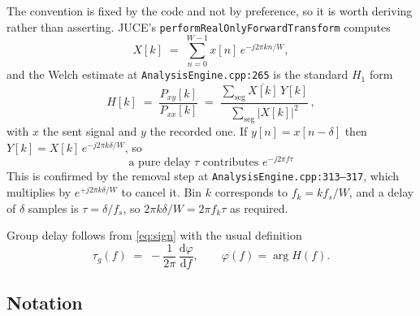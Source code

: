 \documentclass[11pt,a4paper]{article}
\newcommand{\srcref}[2]{\texttt{\small #1}\discretionary{}{}{}\texttt{\small :#2}}
\newcommand{\code}[1]{\texttt{\small #1}}
\begin{document}
The convention is fixed by the code and not by preference, so it is worth
deriving rather than asserting. JUCE's \code{performRealOnlyForwardTransform}
computes
%
\begin{equation}
  X[k] \;=\; \sum_{n=0}^{W-1} x[n]\, e^{-j 2\pi k n / W},
\end{equation}
%
and the Welch estimate at \srcref{AnalysisEngine.cpp}{265} is the standard
$H_1$ form
%
\begin{equation}
  H[k] \;=\; \frac{P_{xy}[k]}{P_{xx}[k]}
        \;=\; \frac{\sum_{\text{seg}} \overline{X[k]}\, Y[k]}
                   {\sum_{\text{seg}} \bigl|X[k]\bigr|^2}\,,
  \label{eq:h1}
\end{equation}
%
with $x$ the sent signal and $y$ the recorded one. If $y[n] = x[n-\delta]$ then
$Y[k] = X[k]\,e^{-j2\pi k \delta/W}$, so
%
\begin{equation}
  \boxed{\;\text{a pure delay } \tau \text{ contributes } e^{-j 2\pi f \tau}\;}
  \label{eq:sign}
\end{equation}
%
This is confirmed by the removal step at \srcref{AnalysisEngine.cpp}{313--317},
which multiplies by $e^{+j 2\pi k \delta / W}$ to cancel it. Bin $k$ corresponds
to $f_k = k f_s / W$, and a delay of $\delta$ samples is $\tau = \delta/f_s$, so
$2\pi k \delta / W = 2\pi f_k \tau$ as required.

Group delay follows from \eqref{eq:sign} with the usual definition
%
\begin{equation}
  \tau_g(f) \;=\; -\frac{1}{2\pi}\,\frac{\mathrm{d}\varphi}{\mathrm{d}f},
  \qquad \varphi(f) = \arg H(f).
  \label{eq:groupdelay}
\end{equation}

\subsection{Notation}
\end{document}
